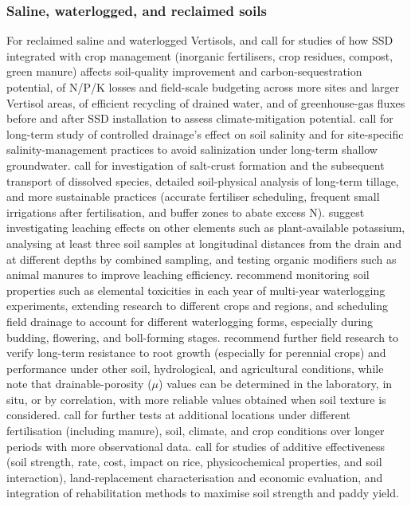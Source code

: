 \documentclass[11pt]{article}
\begin{document}
\subsubsection{Saline, waterlogged, and reclaimed soils}

For reclaimed saline and waterlogged Vertisols, \textcite{Mukhopadhyay2023} and \textcite{Mukhopadhyay2023b} call for studies of how SSD integrated with crop management (inorganic fertilisers, crop residues, compost, green manure) affects soil-quality improvement and carbon-sequestration potential, of N/P/K losses and field-scale budgeting across more sites and larger Vertisol areas, of efficient recycling of drained water, and of greenhouse-gas fluxes before and after SSD installation to assess climate-mitigation potential. \textcite{ElGhannam2023} call for long-term study of controlled drainage's effect on soil salinity and for site-specific salinity-management practices to avoid salinization under long-term shallow groundwater. \textcite{Colombani2016} call for investigation of salt-crust formation and the subsequent transport of dissolved species, detailed soil-physical analysis of long-term tillage, and more sustainable practices (accurate fertiliser scheduling, frequent small irrigations after fertilisation, and buffer zones to abate excess N). \textcite{SoltaniGerdefaramarzi2020} suggest investigating leaching effects on other elements such as plant-available potassium, analysing at least three soil samples at longitudinal distances from the drain and at different depths by combined sampling, and testing organic modifiers such as animal manures to improve leaching efficiency. \textcite{Qian2021} recommend monitoring soil properties such as elemental toxicities in each year of multi-year waterlogging experiments, extending research to different crops and regions, and scheduling field drainage to account for different waterlogging forms, especially during budding, flowering, and boll-forming stages. \textcite{Bahçeci2018} recommend further field research to verify long-term resistance to root growth (especially for perennial crops) and performance under other soil, hydrological, and agricultural conditions, while \textcite{Bahceci2008} note that drainable-porosity ($\mu$) values can be determined in the laboratory, in situ, or by correlation, with more reliable values obtained when soil texture is considered. \textcite{Sadhukhan2019} call for further tests at additional locations under different fertilisation (including manure), soil, climate, and crop conditions over longer periods with more observational data. \textcite{Isa2023} call for studies of additive effectiveness (soil strength, rate, cost, impact on rice, physicochemical properties, and soil interaction), land-replacement characterisation and economic evaluation, and integration of rehabilitation methods to maximise soil strength and paddy yield.
\end{document}
